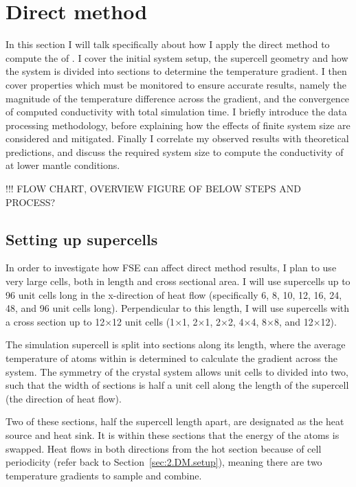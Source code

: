 \pagebreak


\section{\label{sec:3.direct}Direct method}

In this section I will talk specifically about how I apply the direct method to compute the \tcs of \bdg. I cover the initial system setup, the supercell geometry and how the system is divided into sections to determine the temperature gradient. I then cover properties which must be monitored to ensure accurate results, namely the magnitude of the temperature difference across the gradient, and the convergence of computed conductivity with total simulation time. I briefly introduce the data processing methodology, before explaining how the effects of finite system size are considered and mitigated. Finally I correlate my observed results with theoretical predictions, and discuss the required system size to compute the conductivity of \bdgs at lower mantle conditions.

!!! FLOW CHART, OVERVIEW FIGURE OF BELOW STEPS AND PROCESS?


\subsection{\label{sec:3.DM.cell}Setting up supercells}

In order to investigate how FSE can affect direct method results, I plan to use very large cells, both in length and cross sectional area. I will use supercells up to 96 unit cells long in the x-direction of heat flow (specifically 6, 8, 10, 12, 16, 24, 48, and 96 unit cells long). Perpendicular to this length, I will use supercells with a cross section up to 12$\times$12 unit cells (1$\times$1, 2$\times$1, 2$\times$2, 4$\times$4, 8$\times$8, and 12$\times$12).

The simulation supercell is split into sections along its length, where the average temperature of atoms within is determined to calculate the gradient across the system. The symmetry of the \bdgs crystal system allows unit cells to divided into two, such that the width of sections is half a unit cell along the length of the supercell (the direction of heat flow). 

Two of these sections, half the supercell length apart, are designated as the heat source and heat sink. It is within these sections that the energy of the atoms is swapped. Heat flows in both directions from the hot section because of cell periodicity (refer back to Section~\ref{sec:2.DM.setup}), meaning there are two temperature gradients to sample and combine. 


